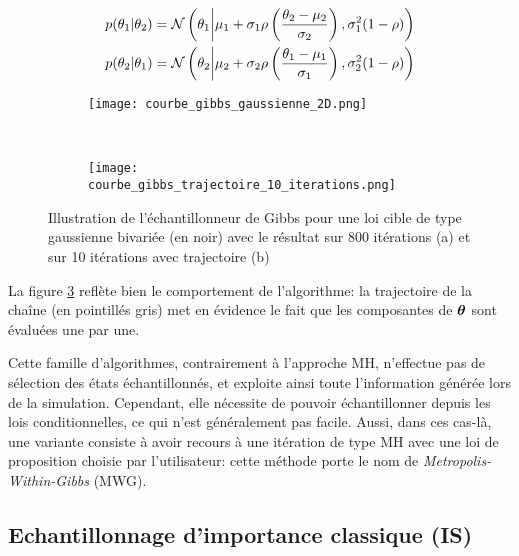  \begin{equation}
	 {
	 \label{eq_conditionnelles_gaussienne_bivariee}
	 \begin{split}
	 p(\theta_1 | \theta_2) &= \mathcal{N}\left(\theta_1 \middle\vert \mu_1 + \sigma_1 {\rho}\left(\dfrac{\theta_2 - \mu_2}{\sigma_2}\right), \sigma_1^2 (1-{\rho})\right) \\
	 p(\theta_2 | \theta_1) &= \mathcal{N}\left(\theta_2 \middle\vert \mu_2 + \sigma_2 {\rho}\left(\dfrac{\theta_1 - \mu_1}{\sigma_1}\right), \sigma_2^2 (1-{\rho})\right)
	 \end{split}
	}
 \end{equation}
 
\begin{figure}[h!]
	\centering
	\begin{subfigure}[t]{0.5\textwidth}
		\centering
		\texttt{[image: courbe\_gibbs\_gaussienne\_2D.png]}
		\caption{}
		\label{subfig_gibbs_all}
	\end{subfigure}%
	~ 
	\begin{subfigure}[t]{0.5\textwidth}
		\centering
		\texttt{[image: courbe\_gibbs\_trajectoire\_10\_iterations.png]}
		\caption{}
		\label{subfig_gibbs_10}
	\end{subfigure}
	\caption{Illustration de l'échantillonneur de Gibbs pour une loi cible de type gaussienne bivariée (en noir) avec le résultat sur 800 itérations (a) et sur 10 itérations avec trajectoire (b)}
\end{figure}

La figure \ref{subfig_gibbs_10} reflète bien le comportement de l'algorithme: la trajectoire de la chaîne (en pointillés gris) met en évidence le fait que les composantes de ${\bm{\theta}}$ sont évaluées une par une. 

Cette famille d'algorithmes, contrairement à l'approche MH, n'effectue pas de sélection des états échantillonnés, et exploite ainsi toute l'information générée lors de la simulation. Cependant, elle nécessite de pouvoir échantillonner depuis les lois conditionnelles, ce qui n'est généralement pas facile. Aussi, dans ces cas-là, une variante consiste à avoir recours à une itération de type MH avec une loi de proposition choisie par l'utilisateur: cette méthode porte le nom de \textit{Metropolis-Within-Gibbs} (MWG).\\

 
 \subsection{Echantillonnage d'importance classique (IS)}
 
